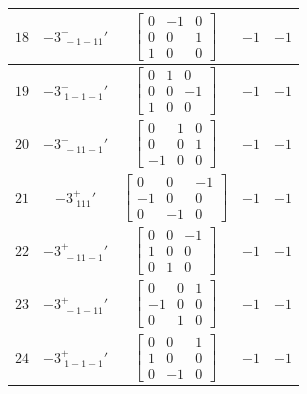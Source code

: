 \documentclass[fleqn,8pt]{jsarticle}
\begin{document}
\begin{longtable}{ccccc}
$ 18 $ & $ -3^{-}_{\,\,-1-11}{}' $ & $ \begin{bmatrix} 0 & -1 & 0 \\ 0 & 0 & 1 \\ 1 & 0 & 0 \end{bmatrix} $ & $ -1 $ & $ -1 $ \\ \hline
$ 19 $ & $ -3^{-}_{\,\,1-1-1}{}' $ & $ \begin{bmatrix} 0 & 1 & 0 \\ 0 & 0 & -1 \\ 1 & 0 & 0 \end{bmatrix} $ & $ -1 $ & $ -1 $ \\ \hline
$ 20 $ & $ -3^{-}_{\,\,-11-1}{}' $ & $ \begin{bmatrix} 0 & 1 & 0 \\ 0 & 0 & 1 \\ -1 & 0 & 0 \end{bmatrix} $ & $ -1 $ & $ -1 $ \\ \hline
$ 21 $ & $ -3^{+}_{\,\,111}{}' $ & $ \begin{bmatrix} 0 & 0 & -1 \\ -1 & 0 & 0 \\ 0 & -1 & 0 \end{bmatrix} $ & $ -1 $ & $ -1 $ \\ \hline
$ 22 $ & $ -3^{+}_{\,\,-11-1}{}' $ & $ \begin{bmatrix} 0 & 0 & -1 \\ 1 & 0 & 0 \\ 0 & 1 & 0 \end{bmatrix} $ & $ -1 $ & $ -1 $ \\ \hline
$ 23 $ & $ -3^{+}_{\,\,-1-11}{}' $ & $ \begin{bmatrix} 0 & 0 & 1 \\ -1 & 0 & 0 \\ 0 & 1 & 0 \end{bmatrix} $ & $ -1 $ & $ -1 $ \\ \hline
$ 24 $ & $ -3^{+}_{\,\,1-1-1}{}' $ & $ \begin{bmatrix} 0 & 0 & 1 \\ 1 & 0 & 0 \\ 0 & -1 & 0 \end{bmatrix} $ & $ -1 $ & $ -1 $ \\
\end{longtable}
\end{document}
